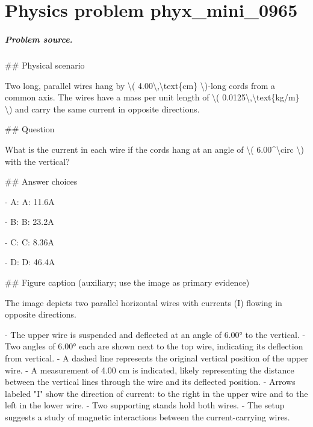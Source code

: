 
\chapter{Physics problem phyx\_mini\_0965}
\label{ch:PhyXMiniProblems_problem_phyx_mini_0965}

\paragraph{Problem source.}
\#\# Physical scenario

Two long, parallel wires hang by \textbackslash{}( 4.00\textbackslash{},\textbackslash{}text\{cm\} \textbackslash{})-long cords from a common axis. The wires have a mass per unit length of \textbackslash{}( 0.0125\textbackslash{},\textbackslash{}text\{kg/m\} \textbackslash{}) and carry the same current in opposite directions.

\#\# Question

What is the current in each wire if the cords hang at an angle of \textbackslash{}( 6.00\textasciicircum{}\textbackslash{}circ \textbackslash{}) with the vertical?

\#\# Answer choices

- A: A: 11.6A

- B: B: 23.2A

- C: C: 8.36A

- D: D: 46.4A

\#\# Figure caption (auxiliary; use the image as primary evidence)

The image depicts two parallel horizontal wires with currents (I) flowing in opposite directions. 

- The upper wire is suspended and deflected at an angle of 6.00° to the vertical. 
- Two angles of 6.00° each are shown next to the top wire, indicating its deflection from vertical.
- A dashed line represents the original vertical position of the upper wire.
- A measurement of 4.00 cm is indicated, likely representing the distance between the vertical lines through the wire and its deflected position. 
- Arrows labeled "I" show the direction of current: to the right in the upper wire and to the left in the lower wire.
- Two supporting stands hold both wires.
- The setup suggests a study of magnetic interactions between the current-carrying wires.

